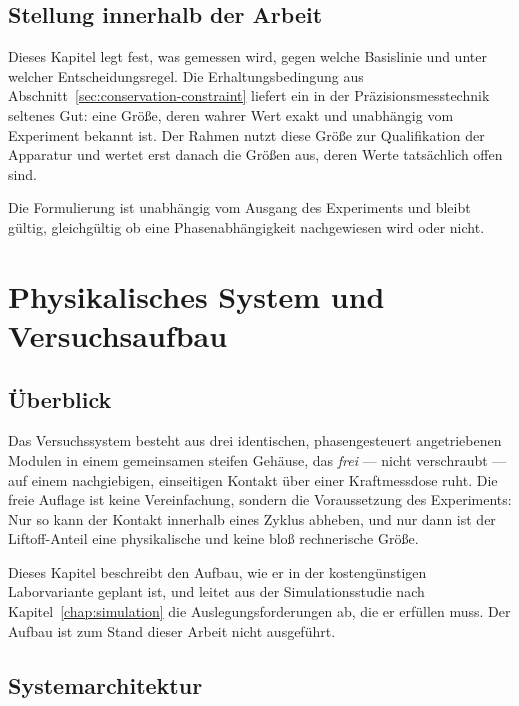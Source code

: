 \documentclass[12pt,a4paper]{report}
\begin{document}
\section{Stellung innerhalb der Arbeit}

Dieses Kapitel legt fest, was gemessen wird, gegen welche Basislinie und
unter welcher Entscheidungsregel. Die Erhaltungsbedingung aus
Abschnitt~\ref{sec:conservation-constraint} liefert ein in der
Präzisionsmesstechnik seltenes Gut: eine Größe, deren wahrer Wert exakt
und unabhängig vom Experiment bekannt ist. Der Rahmen nutzt diese Größe
zur Qualifikation der Apparatur und wertet erst danach die Größen aus,
deren Werte tatsächlich offen sind.

Die Formulierung ist unabhängig vom Ausgang des Experiments und bleibt
gültig, gleichgültig ob eine Phasenabhängigkeit nachgewiesen wird oder
nicht.


\chapter{Physikalisches System und Versuchsaufbau}
\label{chap:system}

\section{Überblick}

Das Versuchssystem besteht aus drei identischen, phasengesteuert
angetriebenen Modulen in einem gemeinsamen steifen Gehäuse, das
\emph{frei} --- nicht verschraubt --- auf einem nachgiebigen,
einseitigen Kontakt über einer Kraftmessdose ruht. Die freie Auflage ist
keine Vereinfachung, sondern die Voraussetzung des Experiments: Nur so
kann der Kontakt innerhalb eines Zyklus abheben, und nur dann ist der
Liftoff-Anteil eine physikalische und keine bloß rechnerische Größe.

Dieses Kapitel beschreibt den Aufbau, wie er in der kostengünstigen
Laborvariante geplant ist, und leitet aus der Simulationsstudie nach
Kapitel~\ref{chap:simulation} die Auslegungsforderungen ab, die er
erfüllen muss. Der Aufbau ist zum Stand dieser Arbeit nicht ausgeführt.

\section{Systemarchitektur}
\end{document}
